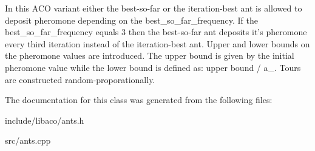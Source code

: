 In this ACO variant either the best-so-far or the iteration-best ant is allowed to deposit pheromone depending on the best\_\-so\_\-far\_\-frequency. If the best\_\-so\_\-far\_\-frequency equals 3 then the best-so-far ant deposits it's pheromone every third iteration instead of the iteration-best ant. Upper and lower bounds on the pheromone values are introduced. The upper bound is given by the initial pheromone value while the lower bound is defined as: upper bound / a\_\-. Tours are constructed random-proporationally. 

The documentation for this class was generated from the following files:\begin{CompactItemize}
\item 
include/libaco/ants.h\item 
src/ants.cpp\end{CompactItemize}
